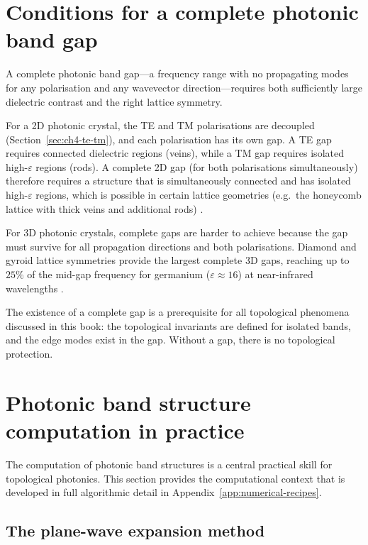 \section{Conditions for a complete photonic band gap}
\label{sec:ch4-complete-gap}

A complete photonic band gap---a frequency range with no propagating
modes for any polarisation and any wavevector direction---requires
both sufficiently large dielectric contrast and the right lattice
symmetry.

For a 2D photonic crystal, the TE and TM polarisations are decoupled
(Section~\ref{sec:ch4-te-tm}), and each polarisation has its own gap.
A TE gap requires connected dielectric regions (veins), while a TM gap
requires isolated high-$\varepsilon$ regions (rods).  A complete 2D
gap (for both polarisations simultaneously) therefore requires a
structure that is simultaneously connected and has isolated
high-$\varepsilon$ regions, which is possible in certain lattice
geometries (e.g.\ the honeycomb lattice with thick veins and
additional rods) \cite{haldane2008possible}.

For 3D photonic crystals, complete gaps are harder to achieve because
the gap must survive for all propagation directions and both
polarisations.  Diamond and gyroid lattice symmetries provide the
largest complete 3D gaps, reaching up to $25\%$ of the mid-gap
frequency for germanium ($\varepsilon\approx 16$) at near-infrared
wavelengths \cite{price2022roadmap}.

The existence of a complete gap is a prerequisite for all topological
phenomena discussed in this book: the topological invariants are
defined for isolated bands, and the edge modes exist in the gap.
Without a gap, there is no topological protection.

\section{Photonic band structure computation in practice}
\label{sec:ch4-band-computation}

The computation of photonic band structures is a central practical
skill for topological photonics.  This section provides the
computational context that is developed in full algorithmic detail in
Appendix~\ref{app:numerical-recipes}.

\subsection{The plane-wave expansion method}
\label{sec:ch4-pwe-method}

